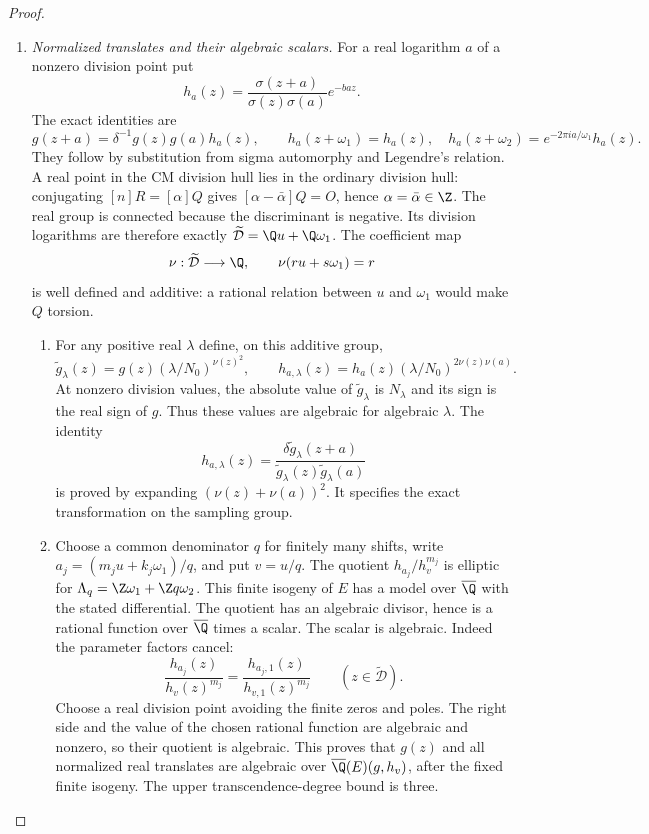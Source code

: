 \begin{proof}
\begin{enumerate}[label=\arabic*.,leftmargin=0pt,labelsep=.5em]
\item \emph{Normalized translates and their algebraic scalars.}
For a real logarithm $a$ of a nonzero division point put
\[
 h_a(z)=\frac{\sigma(z+a)}{\sigma(z)\sigma(a)}e^{-baz}.
\]
The exact identities are
\[
 g(z+a)=\delta^{-1}g(z)g(a)h_a(z),\qquad
 h_a(z+\omega_1)=h_a(z),\quad
 h_a(z+\omega_2)=e^{-2\pi ia/\omega_1}h_a(z).
\]
They follow by substitution from sigma automorphy and Legendre's
relation. A real point in the CM division hull lies in the
ordinary division hull: conjugating $[n]R=[\alpha]Q$ gives
$[\alpha-\bar\alpha]Q=O$, hence $\alpha=\bar\alpha\in\Z$.
The real group is connected because the discriminant is negative.
Its division logarithms are therefore exactly
$\widetilde{\mathcal D}=\Q u+\Q\omega_1$.
The coefficient map
\[
 \nu:\widetilde{\mathcal D}\longrightarrow\Q,
 \qquad \nu(ru+s\omega_1)=r
\]
is well defined and additive: a rational relation between $u$
and $\omega_1$ would make $Q$ torsion.


\begin{enumerate}[label=(\alph*),leftmargin=1.3em,labelsep=.5em]
\item  For any positive real $\lambda$ define, on this additive group,
\[
 \widetilde g_\lambda(z)
   =g(z)(\lambda/N_0)^{\nu(z)^2},\qquad
 h_{a,\lambda}(z)
   =h_a(z)(\lambda/N_0)^{2\nu(z)\nu(a)}.
\]
At nonzero division values, the absolute value of
$\widetilde g_\lambda$ is $N_\lambda$ and its sign is the real
sign of $g$. Thus these values are algebraic for algebraic
$\lambda$. The identity
\[
 h_{a,\lambda}(z)=
 \frac{\delta\widetilde g_\lambda(z+a)}
      {\widetilde g_\lambda(z)\widetilde g_\lambda(a)}
\]
is proved by expanding $(\nu(z)+\nu(a))^2$.
It specifies the exact transformation on the sampling group.


\item  Choose a common denominator $q$ for finitely many shifts,
write $a_j=(m_ju+k_j\omega_1)/q$, and put $v=u/q$.
The quotient $h_{a_j}/h_v^{m_j}$ is elliptic for
$\Lambda_q=\Z\omega_1+\Z q\omega_2$. This finite isogeny
of $E$ has a model over $\overline\Q$ with the stated
differential. The quotient has an algebraic divisor, hence
is a rational function over $\overline\Q$ times a scalar.
The scalar is algebraic. Indeed the parameter factors cancel:
\[
 \frac{h_{a_j}(z)}{h_v(z)^{m_j}}
  =\frac{h_{a_j,1}(z)}{h_{v,1}(z)^{m_j}}
       \qquad(z\in\widetilde{\mathcal D}).
\]
Choose a real division point avoiding the finite zeros and poles.
The right side and the value of the chosen rational function
are algebraic and nonzero, so their quotient is algebraic.
This proves that $g(z)$ and all normalized real translates are
algebraic over $\overline\Q(E)(g,h_v)$, after the fixed finite
isogeny. The upper transcendence-degree bound is three.



\end{enumerate}
\end{enumerate}
\end{proof}
